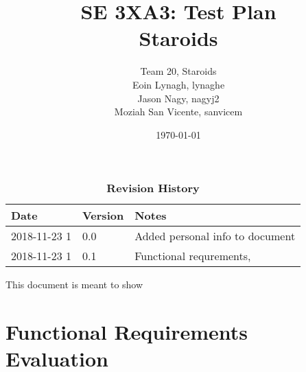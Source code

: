 \documentclass[12pt, titlepage]{article}
\title{SE 3XA3: Test Plan\\Staroids}
\author{Team 20, Staroids
		\\ Eoin Lynagh, lynaghe
		\\ Jason Nagy, nagyj2
		\\ Moziah San Vicente, sanvicem
}
\date{\today}
\begin{document}
\maketitle

\tableofcontents
\listoftables
\listoffigures

\begin{table}[bp]
\caption{\bf Revision History}
\begin{tabularx}{\textwidth}{p{3cm}p{2cm}X}
\toprule {\bf Date} & {\bf Version} & {\bf Notes}\\
\midrule
2018-11-23 1 & 0.0 & Added personal info to document\\
2018-11-23 1 & 0.1 & Functional requrements, \\
\bottomrule
\end{tabularx}
\end{table}

\newpage


This document is meant to show \\

\section{Functional Requirements Evaluation}
\end{document}
